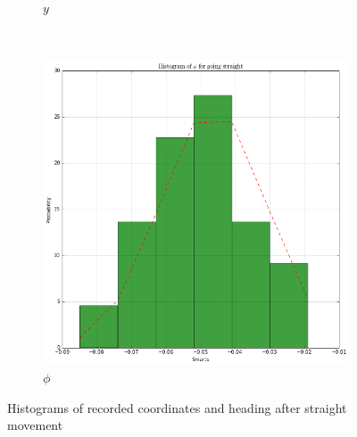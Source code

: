 \documentclass[paper=a4, fontsize=11pt]{scrartcl} %
\begin{document}
\begin{figure}[h!]
\begin{subfigure}[b]{0.3\textwidth}
            \caption{$y$}
        \end{subfigure}
        ~
        \begin{subfigure}[b]{0.3\textwidth}
            \setlength{\fboxsep}{0.5pt} %
            \setlength{\fboxrule}{0.5pt}
            \includegraphics[width=\textwidth,fbox]{images/histogram_1_phi_straight.png}
            \caption{$\phi$}
        \end{subfigure}
        \caption{Histograms of recorded coordinates and heading after straight movement}
    \end{figure}
    
    \newpage
\end{document}
